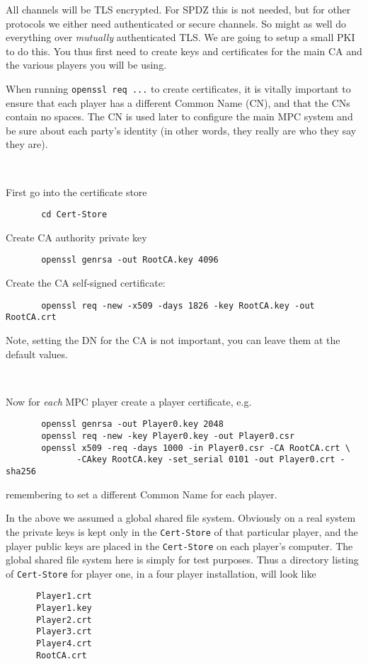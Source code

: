 All channels will be TLS encrypted. For SPDZ this is not needed, but for
other protocols we either need authenticated or secure channels. So might
as well do everything over {\em mutually} authenticated TLS. We are going
to setup a small PKI to do this. You thus first need to create
keys and certificates for the main CA and the various players you
will be using.

When running \verb+openssl req ...+ to create certificates, it is
vitally important to ensure that each player has a different Common
Name (CN), and that the CNs contain no spaces.  The CN is used later
to configure the main MPC system and be sure about each party's
identity (in other words, they really are who they say they are).

~~

\noindent
First go into the certificate store
\begin{verbatim}
       cd Cert-Store
\end{verbatim}
Create CA authority private key
\begin{verbatim}
       openssl genrsa -out RootCA.key 4096
\end{verbatim}
Create the CA self-signed certificate:
\begin{verbatim}
       openssl req -new -x509 -days 1826 -key RootCA.key -out RootCA.crt
\end{verbatim}
Note, setting the DN for the CA is not important, you can leave them
at the default values.

~~

\noindent
Now for {\em each} MPC player create a player certificate, e.g.
\begin{verbatim}
       openssl genrsa -out Player0.key 2048
       openssl req -new -key Player0.key -out Player0.csr
       openssl x509 -req -days 1000 -in Player0.csr -CA RootCA.crt \
              -CAkey RootCA.key -set_serial 0101 -out Player0.crt -sha256
\end{verbatim}
remembering to set a different Common Name for each player.

In the above we assumed a global shared file system.  Obviously on
a real system the private keys is kept only in the
\verb+Cert-Store+ of that particular player, and the player public
keys are placed in the \verb+Cert-Store+ on each player's
computer. The global shared file system here is simply for test
purposes. Thus a directory listing of \verb+Cert-Store+
for player one, in a four player installation, will look like
\begin{verbatim}
      Player1.crt
      Player1.key
      Player2.crt
      Player3.crt
      Player4.crt
      RootCA.crt
\end{verbatim}


